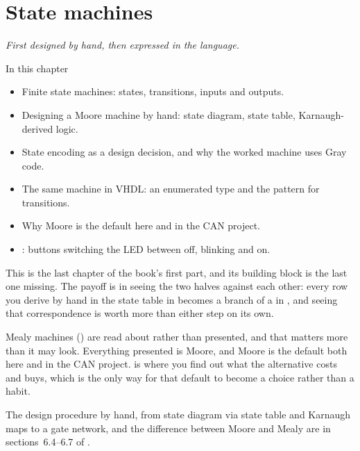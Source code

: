 
\chapter{State machines}
\label{c8:ch}

{\large\itshape First designed by hand, then expressed in the language.\par}

\begin{chapterbox}{In this chapter}
\begin{itemize}
  \item Finite state machines: states, transitions, inputs and outputs.
  \item Designing a Moore machine by hand: state diagram, state table, Karnaugh-derived logic.
  \item State encoding as a design decision, and why the worked machine uses Gray code.
  \item The same machine in VHDL: an enumerated type and the  pattern for transitions.
  \item Why Moore is the default here and in the CAN project.
  \item {}: buttons switching the LED between off, blinking and on.
\end{itemize}
\end{chapterbox}

This is the last chapter of the book's first part, and its building block is the last one missing.
The payoff is in seeing the two halves against each other: every row you derive by hand in the state
table in  becomes a branch of a  in , and seeing
that correspondence is worth more than either step on its own.

Mealy machines () are read about rather than presented, and that matters more
than it may look. Everything presented is Moore, and Moore is the default both here and in the CAN
project.  is where you find out what the alternative costs and buys, which is
the only way for that default to become a choice rather than a habit.

\note[Refresher] The design procedure by hand, from state diagram via state table and Karnaugh maps
to a gate network, and the difference between Moore and Mealy are in sections~6.4--6.7 of \debook{}.




